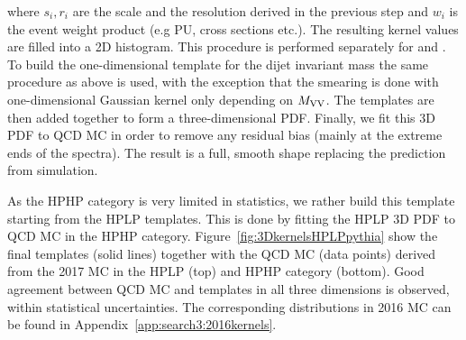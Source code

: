 where $s_{i}, r_{i}$ are the scale and the resolution derived in the previous step and $w_i$ is the event weight product (e.g PU, cross sections etc.). 
The resulting kernel values are filled into a 2D histogram. This procedure is performed separately for \MJO and \MJT. To build the one-dimensional template for the dijet invariant mass the same procedure as above is used, with the exception that
the smearing is done with one-dimensional Gaussian kernel only depending on $M_{\rm VV}$.
The templates are then added together to form a three-dimensional PDF. Finally, we fit this 3D PDF to QCD MC in order to remove any residual bias (mainly at the extreme ends of the spectra). The result is a full, smooth shape replacing the prediction from simulation.\par
As the HPHP category is very limited in statistics, we rather build this template starting from the HPLP templates. This is done by fitting the HPLP 3D PDF to QCD MC in the HPHP category. Figure~\ref{fig:3DkernelsHPLPpythia} show the final templates (solid lines) together with the QCD MC (data points) derived from the 2017 MC in the HPLP (top) and HPHP category (bottom). Good agreement between QCD MC and templates in all three dimensions is observed, within statistical uncertainties. The corresponding distributions in 2016 MC can be found in Appendix~\ref{app:search3:2016kernels}.\par
